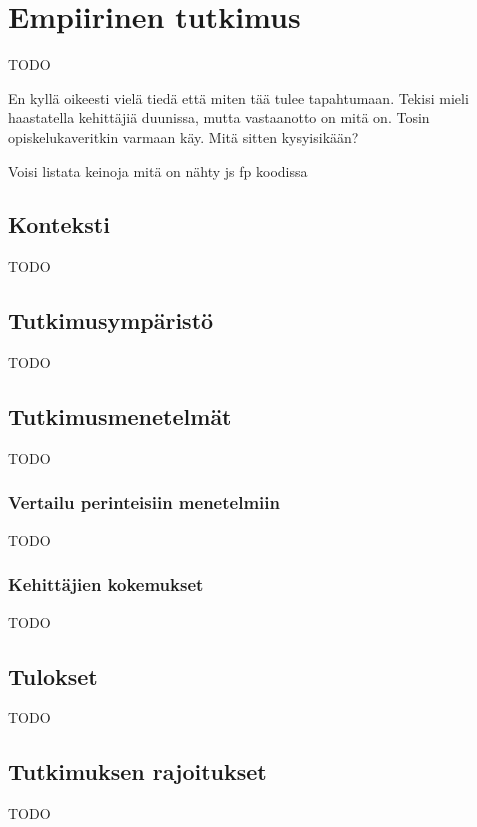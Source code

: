 \vspace{21.5pt}
\chapter{Empiirinen tutkimus}
TODO

En kyllä oikeesti vielä tiedä että miten tää tulee tapahtumaan. Tekisi mieli haastatella kehittäjiä duunissa, mutta vastaanotto on mitä on. Tosin opiskelukaveritkin varmaan käy. Mitä sitten kysyisikään?

Voisi listata keinoja mitä on nähty \gls{js} fp koodissa

\section{Konteksti}

TODO

\section{Tutkimusympäristö}

TODO

\section{Tutkimusmenetelmät}

TODO
\subsection{Vertailu perinteisiin menetelmiin}

TODO

\subsection{Kehittäjien kokemukset}

TODO

\section{Tulokset}

TODO

\section{Tutkimuksen rajoitukset}

TODO